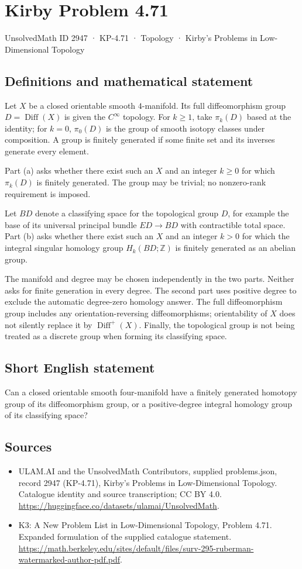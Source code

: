 \documentclass[11pt,a4paper]{article}
\begin{document}
\section*{Kirby Problem 4.71}\label{2947}
{\small UnsolvedMath ID 2947 · KP-4.71 · Topology · Kirby's Problems in Low-Dimensional Topology}
\subsection{Definitions and mathematical statement}
Let $X$ be a closed orientable smooth $4$-manifold.
Its full diffeomorphism group $D=\operatorname{Diff}(X)$ is given
the $C^\infty$ topology. For $k\ge1$, take $\pi_k(D)$ based at
the identity; for $k=0$, $\pi_0(D)$ is the group of smooth
isotopy classes under composition. A group is finitely generated
if some finite set and its inverses generate every element.

Part (a) asks whether there exist such an $X$ and an integer
$k\ge0$ for which $\pi_k(D)$ is finitely generated. The group
may be trivial; no nonzero-rank requirement is imposed.

Let $BD$ denote a classifying space for the topological group $D$,
for example the base of its universal principal bundle $ED\to BD$
with contractible total space. Part (b) asks whether there exist
such an $X$ and an integer $k>0$ for which the integral singular
homology group $H_k(BD;\mathbb Z)$ is finitely generated as an
abelian group.

The manifold and degree may be chosen independently in the two
parts. Neither asks for finite generation in every degree. The
second part uses positive degree to exclude the automatic degree-zero
homology answer. The full diffeomorphism group includes any
orientation-reversing diffeomorphisms; orientability of $X$ does not
silently replace it by $\operatorname{Diff}^+(X)$. Finally, the
topological group is not being treated as a discrete group when
forming its classifying space.
\subsection{Short English statement}
Can a closed orientable smooth four-manifold have a finitely generated homotopy group of its diffeomorphism group, or a positive-degree integral homology group of its classifying space?
\subsection{Sources}
\begin{itemize}
\item[S1] ULAM.AI and the UnsolvedMath Contributors, supplied problems.json, record 2947 (KP-4.71), Kirby's Problems in Low-Dimensional Topology. Catalogue identity and source transcription; CC BY 4.0.
\url{https://huggingface.co/datasets/ulamai/UnsolvedMath}.
\item[S2] K3: A New Problem List in Low-Dimensional Topology, Problem 4.71. Expanded formulation of the supplied catalogue statement.
\url{https://math.berkeley.edu/sites/default/files/surv-295-ruberman-watermarked-author-pdf.pdf}.
\end{itemize}
\end{document}
